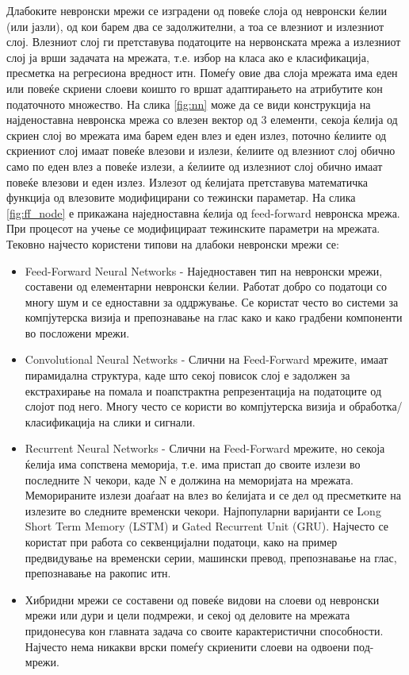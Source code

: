 Длабоките невронски мрежи се изградени од повеќе слоја од невронски ќелии (или јазли), од кои барем два се задолжителни, а тоа се влезниот и излезниот слој. Влезниот слој ги претставува податоците на нервонската мрежа а излезниот слој ја врши задачата на мрежата, т.е. избор на класа ако е класификација, пресметка на регресиона вредност итн. Помеѓу овие два слоја мрежата има еден или повеќе скриени слоеви коишто го вршат адаптирањето на атрибутите кон податочното множество. На слика \ref{fig:nn} може да се види конструкција на најденоставна невронска мрежа со влезен вектор од 3 елементи, секоја ќелија од скриен слој во мрежата има барем еден влез и еден излез, поточно ќелиите од скриениот слој имаат повеќе влезови и излези, ќелиите од влезниот слој обично само по еден влез а повеќе излези, а ќелиите од излезниот слој обично имаат повеќе влезови и еден излез. Излезот од ќелијата претставува математичка функција од влезовите модифицирани со тежински параметар. На слика \ref{fig:ff_node} е прикажана наједноставна ќелија од feed-forward невронска мрежа. При процесот на учење се модифицираат тежинските параметри на мрежата.
Тековно најчесто користени типови на длабоки невронски мрежи се:
\begin{itemize}
    \item Feed-Forward Neural Networks - Наједноставен тип на невронски мрежи, составени од елементарни невронски ќелии. Работат добро со податоци со многу шум и се едноставни за оддржување. Се користат често во системи за компјутерска визија и препознавање на глас како и како градбени компоненти во посложени мрежи.
    \item Convolutional Neural Networks - Слични на Feed-Forward мрежите, имаат пирамидална структура, каде што секој повисок слој е задолжен за екстрахирање на помала и поапстрактна репрезентација на податоците од слојот под него. Многу често се користи во компјутерска визија и обработка/класификација на слики и сигнали.
    \item Recurrent Neural Networks - Слични на Feed-Forward мрежите, но секоја ќелија има сопствена меморија, т.е. има пристап до своите излези во последните N чекори, каде N е должина на меморијата на мрежата. Меморираните излези доаѓаат на влез во ќелијата и се дел од пресметките на излезите во следните временски чекори. Најпопуларни варијанти се Long Short Term Memory (LSTM) и Gated Recurrent Unit (GRU). Најчесто се користат при работа со секвенцијални податоци, како на пример предвидување на временски серии, машински превод, препознавање на глас, препознавање на ракопис итн.
    \item Хибридни мрежи се составени од повеќе видови на слоеви од невронски мрежи или дури и цели подмрежи, и секој од деловите на мрежата придонесува кон главната задача со своите карактеристични способности. Најчесто нема никакви врски помеѓу скриенити слоеви на одвоени под-мрежи.
\end{itemize}

